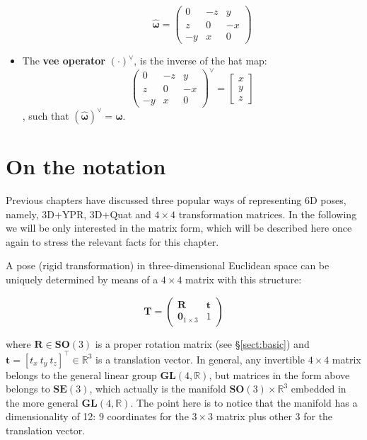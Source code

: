 \documentclass[a4paper,11pt]{report}
\begin{document}
\begin{itemize}
{\begin{equation}
	\quad \quad
	\hat{\bm{\omega}}
	=
	\left(
	\begin{array}{ccc}
	0 & -z & y  \\
	z & 0 & -x  \\
	-y & x & 0
	\end{array}
	\right)
	\end{equation}
}
\item{The \textbf{vee operator} $(\cdot)^{\vee}$, is the inverse of the hat map:
	\begin{equation}
	\label{eq:inv.skew}
	\left(
	\begin{array}{ccc}
	0 & -z & y  \\
	z & 0 & -x  \\
	-y & x & 0
	\end{array}
	\right)
	^{\vee}
	=
	\left[ \begin{array}{c} x \\ y \\z \end{array} \right]
	\end{equation}
	\noindent, such that $(\hat{\bm{\omega}})^\vee = \bm{\omega}$.
}
\end{itemize}



\section{On the notation}
\label{sect:mat_deriv:not}

Previous chapters have discussed three popular ways of representing 6D poses,
namely, 3D+YPR, 3D+Quat and $4\times 4$ transformation matrices.
In the following we will be only interested in the matrix form, which will be
described here once again to stress the relevant facts for this chapter.

A pose (rigid transformation) in three-dimensional Euclidean space can be uniquely determined by means
of a $4 \times 4$ matrix with this structure:

\begin{equation}
\label{eq:T_Rt}
 \mathbf{T} =
\left(
\begin{array}{c|c}
  \mathbf{R} & \mathbf{t} \\
\hline
  \mathbf{0}_{1\times 3} & 1
\end{array}
\right)
\end{equation}

\noindent where $\mathbf{R} \in \mathbf{SO}(3)$
is a proper rotation matrix (see \S\ref{sect:basic}) and $\mathbf{t}=[t_x ~ t_y ~ t_z]^\top \in \mathbb{R}^3$ is a translation vector.
In general, any invertible $4 \times 4$ matrix belongs to the
general linear group $\mathbf{GL}(4,\mathbb{R})$, but
matrices in the form above belongs to $\mathbf{SE}(3)$,
which actually is the manifold $\mathbf{SO}(3) \times \mathbb{R}^3$
embedded in the more general $\mathbf{GL}(4,\mathbb{R})$.
The point here is to notice that the manifold has a dimensionality of 12:
9 coordinates for the $3\times 3$ matrix plus other 3 for the translation vector.
\end{document}
